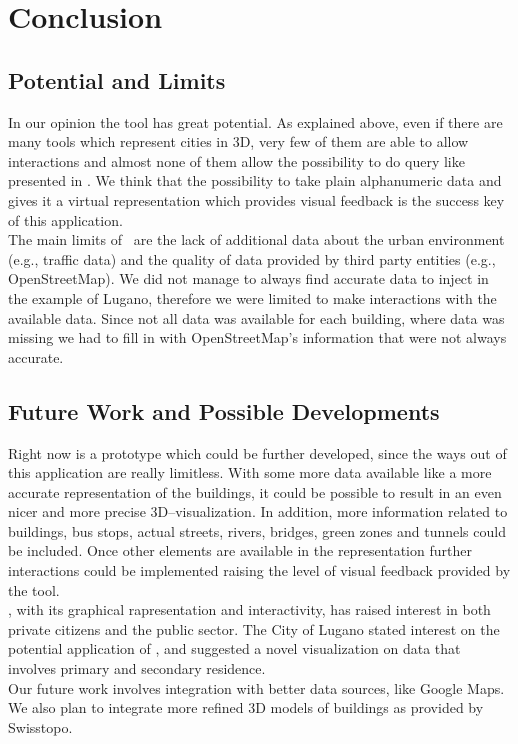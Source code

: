 \section{Conclusion} \label{conclusions}
\subsection{Potential and Limits}
In our opinion the tool has great potential. As explained above, even if there are many tools which represent cities in 3D, very few of them are able to allow interactions and almost none of them allow the possibility to do query like presented in \applicationName. We think that the possibility to take plain alphanumeric data and gives it a virtual representation which provides visual feedback is the success key of this application.\\

The main limits of \applicationName\ are the lack of additional data about the urban environment (e.g., traffic data) and the quality of data provided by third party entities (e.g., OpenStreetMap). We did not manage to always find accurate data to inject in the example of Lugano, therefore we were limited to make interactions with the available data. Since not all data was available for each building, where data was missing we had to fill in with OpenStreetMap's information that were not always accurate.

\subsection{Future Work and Possible Developments}
Right now \applicationName is a prototype which could be further developed, since the ways out of this application are really limitless. With some more data available like a more accurate representation of the buildings, it could be possible to result in an even nicer and more precise 3D--visualization. In addition, more information related to buildings, bus stops, actual streets, rivers, bridges, green zones and tunnels could be included. Once other elements are available in the representation further interactions could be implemented raising the level of visual feedback provided by the tool.\\

\applicationName, with its graphical rapresentation and interactivity, has raised interest in both private citizens and the public sector. The City of Lugano stated interest on the potential application of \applicationName, and suggested a novel visualization on data that involves primary and secondary residence.\\

Our future work involves integration with better data sources, like Google Maps. We also plan to integrate more refined 3D models of buildings as provided by Swisstopo.
